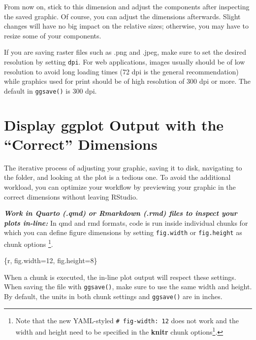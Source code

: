 \documentclass[
]{krantz}
\makeatletter
\newenvironment{Shaded}{\begin{snugshade}}{\end{snugshade}}
\newcommand{\NormalTok}[1]{#1}
\renewcommand{\href}[2]{#2\footnote{\url{#1}}}
\newenvironment{kframe}{%
\medskip{}
\setlength{\fboxsep}{.8em}
 \def\at@end@of@kframe{}%
 \ifinner\ifhmode%
  \def\at@end@of@kframe{\end{minipage}}%
  \begin{minipage}{\columnwidth}%
 \fi\fi%
 \def\FrameCommand##1{\hskip\@totalleftmargin \hskip-\fboxsep
 \colorbox{shadecolor}{##1}\hskip-\fboxsep
     \hskip-\linewidth \hskip-\@totalleftmargin \hskip\columnwidth}%
 \MakeFramed {\advance\hsize-\width
   \@totalleftmargin\z@ \linewidth\hsize
   \@setminipage}}%
 {\par\unskip\endMakeFramed%
 \at@end@of@kframe}
\renewenvironment{Shaded}{\begin{kframe}}{\end{kframe}}
\makeatother
\begin{document}
From now on, stick to this dimension and adjust the components after inspecting the saved graphic. Of course, you can adjust the dimensions afterwards. Slight changes will have no big impact on the relative sizes; otherwise, you may have to resize some of your components.

If you are saving raster files such as .png and .jpeg, make sure to set the desired resolution by setting \texttt{dpi}. For web applications, images usually should be of low resolution to avoid long loading times (72 dpi is the general recommendation) while graphics used for print should be of high resolution of 300 dpi or more. The default in \texttt{ggsave()} is 300 dpi.

\hypertarget{display-ggplot-output-with-the-correct-dimensions}{%
\section{Display ggplot Output with the ``Correct'' Dimensions}\label{display-ggplot-output-with-the-correct-dimensions}}

The iterative process of adjusting your graphic, saving it to disk, navigating to the folder, and looking at the plot is a tedious one. To avoid the additional workload, you can optimize your workflow by previewing your graphic in the correct dimensions without leaving RStudio.

\textbf{\emph{Work in Quarto (.qmd) or Rmarkdown (.rmd) files to inspect your plots in-line:}} In qmd and rmd formats, code is run inside individual chunks for which you can define figure dimensions by setting \texttt{fig.width} or \texttt{fig.height} as chunk options \footnote{Note that the new YAML-styled \texttt{\#\textbar{}\ fig-width:\ 12} does not work and the \href{https://github.com/rstudio/rstudio/issues/11708}{width and height need to be specified in the \textbf{knitr} chunk options}.}.

\begin{Shaded}
\begin{Highlighting}[]
\NormalTok{\textasciigrave{}\textasciigrave{}\textasciigrave{}\{r, fig.width=12, fig.height=8\}}
\NormalTok{\textasciigrave{}\textasciigrave{}\textasciigrave{}}
\end{Highlighting}
\end{Shaded}

When a chunk is executed, the in-line plot output will respect these settings. When saving the file with \texttt{ggsave()}, make sure to use the same width and height. By default, the units in both chunk settings and \texttt{ggsave()} are in inches.
\end{document}

